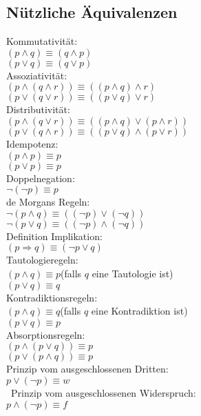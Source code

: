 \subsection*{Nützliche Äquivalenzen}
Kommutativität:\\
$(p \wedge q) \equiv (q \wedge p)$\\
$(p \vee q) \equiv (q \vee p)$\\
Assoziativität:\\
$(p \wedge (q \wedge r)) \equiv ((p \wedge q) \wedge r)$\\
$(p \vee (q \vee r)) \equiv ((p \vee q) \vee r)$\\
Distributivität:\\
$(p \wedge (q \vee r)) \equiv ((p \wedge q) \vee (p \wedge r))$\\
$(p \vee (q \wedge r)) \equiv ((p \vee q) \wedge (p \vee r))$\\
Idempotenz:\\
$(p \wedge p) \equiv p$\\
$(p \vee p) \equiv p$\\
Doppelnegation:\\
$\neg (\neg p) \equiv p$\\
de Morgans Regeln:\\
$\neg (p \wedge q) \equiv ((\neg p) \vee (\neg q))$\\
$\neg (p \vee q) \equiv ((\neg p) \wedge (\neg q))$\\
Definition Implikation:\\
$(p \Rightarrow q) \equiv (\neg p \vee q)$\\
Tautologieregeln:\\
$(p \wedge q) \equiv p$\hfill (falls $q$ eine Tautologie ist)\\
$(p \vee q) \equiv q$\\
Kontradiktionsregeln:\\
$(p \wedge q) \equiv q$\hfill (falls $q$ eine Kontradiktion ist)\\
$(p \vee q) \equiv p$\\
Absorptionsregeln:\\
$(p \wedge (p \vee q)) \equiv p$\\
$(p \vee (p \wedge q)) \equiv p$\\
Prinzip vom ausgeschlossenen Dritten:\\
$p \vee (\neg p) \equiv w$\\\
Prinzip vom ausgeschlossenen Widerspruch:\\
$p \wedge (\neg p) \equiv f$
